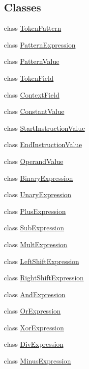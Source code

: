 \subsection*{Classes}
\begin{DoxyCompactItemize}
\item 
class \mbox{\hyperlink{class_token_pattern}{Token\+Pattern}}
\item 
class \mbox{\hyperlink{class_pattern_expression}{Pattern\+Expression}}
\item 
class \mbox{\hyperlink{class_pattern_value}{Pattern\+Value}}
\item 
class \mbox{\hyperlink{class_token_field}{Token\+Field}}
\item 
class \mbox{\hyperlink{class_context_field}{Context\+Field}}
\item 
class \mbox{\hyperlink{class_constant_value}{Constant\+Value}}
\item 
class \mbox{\hyperlink{class_start_instruction_value}{Start\+Instruction\+Value}}
\item 
class \mbox{\hyperlink{class_end_instruction_value}{End\+Instruction\+Value}}
\item 
class \mbox{\hyperlink{class_operand_value}{Operand\+Value}}
\item 
class \mbox{\hyperlink{class_binary_expression}{Binary\+Expression}}
\item 
class \mbox{\hyperlink{class_unary_expression}{Unary\+Expression}}
\item 
class \mbox{\hyperlink{class_plus_expression}{Plus\+Expression}}
\item 
class \mbox{\hyperlink{class_sub_expression}{Sub\+Expression}}
\item 
class \mbox{\hyperlink{class_mult_expression}{Mult\+Expression}}
\item 
class \mbox{\hyperlink{class_left_shift_expression}{Left\+Shift\+Expression}}
\item 
class \mbox{\hyperlink{class_right_shift_expression}{Right\+Shift\+Expression}}
\item 
class \mbox{\hyperlink{class_and_expression}{And\+Expression}}
\item 
class \mbox{\hyperlink{class_or_expression}{Or\+Expression}}
\item 
class \mbox{\hyperlink{class_xor_expression}{Xor\+Expression}}
\item 
class \mbox{\hyperlink{class_div_expression}{Div\+Expression}}
\item 
class \mbox{\hyperlink{class_minus_expression}{Minus\+Expression}}

\end{DoxyCompactItemize}
